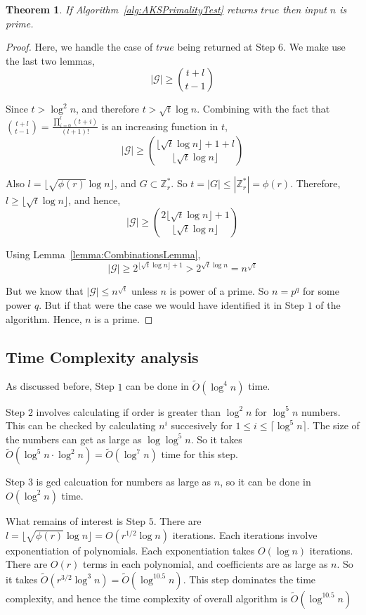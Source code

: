 \documentclass[11pt]{article}
\newtheorem{theorem}{Theorem}[section]
\begin{document}
\begin{theorem}
If Algorithm~\ref{alg:AKSPrimalityTest} returns $true$ then input $n$ is prime.
\end{theorem}
\begin{proof}
Here, we handle the case of $true$ being returned at Step $6$. We make use the last two lemmas,
\[|\mathcal{G}| \geq {{t+l} \choose {t-1}}\]

Since $t > \log^2 n$, and therefore $t > \sqrt t \log n$. Combining with the fact that ${{t+l} \choose {t-1}} = \frac{\prod_{i=0}^l{(t+i)}}{(l+1)!}$ is an increasing function in $t$,
\[|\mathcal{G}| \geq {{{\lfloor \sqrt t \log n \rfloor} + 1 + l} \choose {\lfloor \sqrt t \log n \rfloor}}\]

Also $l = \lfloor \sqrt{\phi(r)} \log n \rfloor$, and $G \subset \mathbb{Z}_r^{*}$. So $t = |G| \leq |\mathbb{Z}_r^{*}| = \phi(r)$. Therefore, $l \geq \lfloor \sqrt{t} \log{n} \rfloor$, and hence,
\[|\mathcal{G}| \geq {{2{\lfloor \sqrt t \log n \rfloor}+1} \choose {\lfloor \sqrt t \log n \rfloor}}\]

Using Lemma~\ref{lemma:CombinationsLemma},
\[|\mathcal{G}| \geq 2^{{\lfloor \sqrt t \log n \rfloor}+1} > 2^{\sqrt t \log n} = n^{\sqrt t}\]

But we know that $|\mathcal{G}| \leq n^{\sqrt t}$ unless $n$ is power of a prime. So $n = p^{q}$ for some power $q$. But if that were the case we would have identified it in Step $1$ of the algorithm. Hence, $n$ is a prime.
\end{proof}

\subsection{Time Complexity analysis}
As discussed before, Step $1$ can be done in $\tilde O(\log^4 n)$ time.

Step $2$ involves calculating if order is greater than $\log^2 n$ for $\log^5 n$ numbers. This can be checked by calculating $n^i$ succesively for $1 \leq i \leq \lceil \log^5 n \rceil$. The size of the numbers can get as large as $\log \log^5 n$. So it takes $\tilde O({\log^5 n} \cdot {\log^2 n}) = \tilde O(\log^7 n)$ time for this step.

Step $3$ is gcd calcuation for numbers as large as $n$, so it can be done in $O(\log^2 n)$ time.

What remains of interest is Step $5$. There are $l = \lfloor \sqrt{\phi(r)} \log n \rfloor = O(r^{1/2} \log n)$ iterations. Each iterations involve exponentiation of polynomials. Each exponentiation takes $O(\log n)$ iterations. There are $O(r)$ terms in each polynomial, and coefficients are as large as $n$. So it takes $\tilde O({r^{3/2} \log^3 n})= \tilde O(\log^{10.5}n)$. This step dominates the time complexity, and hence the time complexity of overall algorithm is $\tilde O(\log^{10.5}n)$
\end{document}
